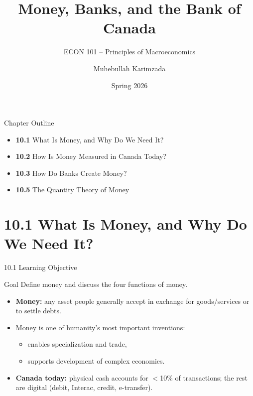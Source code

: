 \documentclass[aspectratio=169]{beamer}
\title{\textbf{Money, Banks, and the Bank of Canada}}
\subtitle{{\large ECON 101 -- Principles of Macroeconomics}}
\author{Muhebullah Karimzada}
\date{Spring 2026}
\begin{document}

\begin{frame}[plain]
  \titlepage
\end{frame}

\begin{frame}{Chapter Outline}
\transfade
\begin{itemize}
  \item \textbf{10.1} What Is Money, and Why Do We Need It?
  \item \textbf{10.2} How Is Money Measured in Canada Today?
  \item \textbf{10.3} How Do Banks Create Money?
  \item \textbf{10.5} The Quantity Theory of Money
\end{itemize}
\end{frame}

\section{10.1 What Is Money, and Why Do We Need It?}

\begin{frame}{10.1 Learning Objective}
\transfade
\begin{block}{Goal}
Define money and discuss the four functions of money.
\end{block}
\begin{itemize}
  \item \textbf{Money:} any asset people generally accept in exchange for goods/services or to settle debts.
  \item Money is one of humanity's most important inventions:
  \begin{itemize}
    \item enables specialization and trade,
    \item supports development of complex economies.
  \end{itemize}
  \item \textbf{Canada today:} physical cash accounts for $<$10\% of transactions; the rest are digital (debit, Interac, credit, e-transfer).
\end{itemize}
\end{frame}
\end{document}
